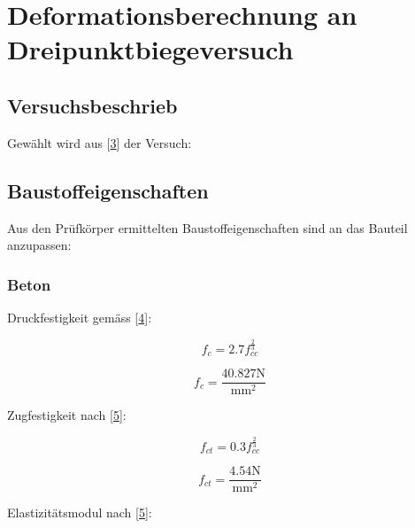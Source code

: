 \documentclass[
  12pt,
  letterpaper,
  egregdoesnotlikesansseriftitles]{scrreprt}
\begin{document}

\hypertarget{deformationsberechnung-an-dreipunktbiegeversuch}{%
\chapter{Deformationsberechnung an
Dreipunktbiegeversuch}\label{deformationsberechnung-an-dreipunktbiegeversuch}}

\hypertarget{versuchsbeschrieb}{%
\section{Versuchsbeschrieb}\label{versuchsbeschrieb}}

Gewählt wird aus {[}\protect\hyperlink{ref-Jaeger2006}{3}{]} der
Versuch:

\hypertarget{baustoffeigenschaften}{%
\section{Baustoffeigenschaften}\label{baustoffeigenschaften}}

Aus den Prüfkörper ermittelten Baustoffeigenschaften sind an das Bauteil
anzupassen:

\hypertarget{beton}{%
\subsection{Beton}\label{beton}}

Druckfestigkeit gemäss {[}\protect\hyperlink{ref-Jaeger2014}{4}{]}:

\begin{equation}f_{c} = 2.7 f_{cc}^{\frac{2}{3}}\end{equation}

\begin{equation}f_{c} = \frac{40.827 \text{N}}{\text{mm}^{2}}\end{equation}

Zugfestigkeit nach {[}\protect\hyperlink{ref-Jaeger2013}{5}{]}:

\begin{equation}f_{ct} = 0.3 f_{cc}^{\frac{2}{3}}\end{equation}

\begin{equation}f_{ct} = \frac{4.54 \text{N}}{\text{mm}^{2}}\end{equation}

Elastizitätsmodul nach {[}\protect\hyperlink{ref-Jaeger2013}{5}{]}:
\end{document}
